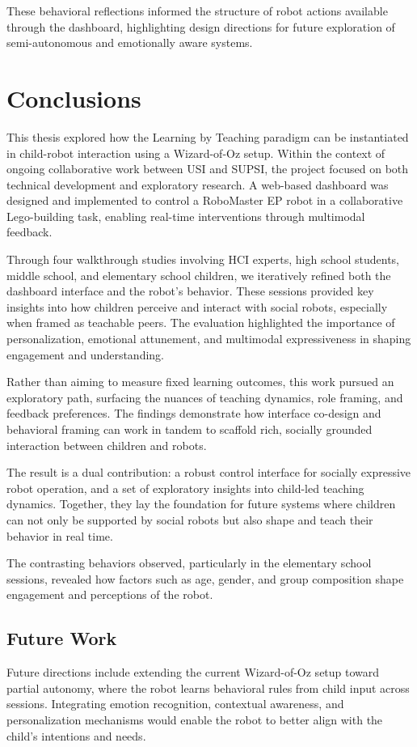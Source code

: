 \documentclass[a4paper]{usiinfbachelorproject}
\begin{document}
These behavioral reflections informed the structure of robot actions available through the dashboard, highlighting design directions for future exploration of semi-autonomous and emotionally aware systems.

\newpage

\section{\textbf{Conclusions}}\label{sec:conclusions}
This thesis explored how the Learning by Teaching paradigm can be instantiated in child-robot interaction using a Wizard-of-Oz setup.
Within the context of ongoing collaborative work between USI and SUPSI, the project focused on both technical development and exploratory research.
A web-based dashboard was designed and implemented to control a RoboMaster EP robot in a collaborative Lego-building task, enabling real-time interventions through multimodal feedback.

Through four walkthrough studies involving HCI experts, high school students, middle school, and elementary school children, we iteratively refined both the dashboard interface and the robot's behavior.
These sessions provided key insights into how children perceive and interact with social robots, especially when framed as teachable peers.
The evaluation highlighted the importance of personalization, emotional attunement, and multimodal expressiveness in shaping engagement and understanding.

Rather than aiming to measure fixed learning outcomes, this work pursued an exploratory path, surfacing the nuances of teaching dynamics, role framing, and feedback preferences.
The findings demonstrate how interface co-design and behavioral framing can work in tandem to scaffold rich, socially grounded interaction between children and robots.

The result is a dual contribution: a robust control interface for socially expressive robot operation, and a set of exploratory insights into child-led teaching dynamics.
Together, they lay the foundation for future systems where children can not only be supported by social robots but also shape and teach their behavior in real time.

The contrasting behaviors observed, particularly in the elementary school sessions, revealed how factors such as age, gender, and group composition shape engagement and perceptions of the robot.

\subsection{\textbf{Future Work}}
Future directions include extending the current Wizard-of-Oz setup toward partial autonomy, where the robot learns behavioral rules from child input across sessions.
Integrating emotion recognition, contextual awareness, and personalization mechanisms would enable the robot to better align with the child's intentions and needs.
\end{document}
